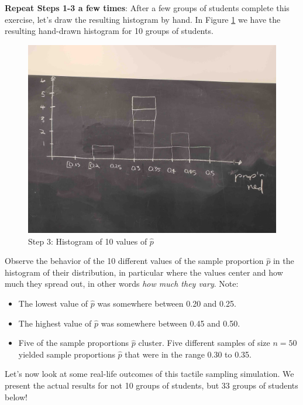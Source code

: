 \documentclass[12pt,]{krantz}
\providecommand{\tightlist}{%
  \setlength{\itemsep}{0pt}\setlength{\parskip}{0pt}}
\theoremstyle{definition}
\theoremstyle{definition}
\theoremstyle{definition}
\theoremstyle{remark}
\begin{document}
\textbf{Repeat Steps 1-3 a few times}: After a few groups of students
complete this exercise, let's draw the resulting histogram by hand. In
Figure \ref{fig:tactile4} we have the resulting hand-drawn histogram for
10 groups of students.

\begin{figure}

{\centering \includegraphics[width=0.8\linewidth]{images/sampling/tactile_3_c} 

}

\caption{Step 3: Histogram of 10 values of $\widehat{p}$}\label{fig:tactile4}
\end{figure}

Observe the behavior of the 10 different values of the sample proportion
\(\widehat{p}\) in the histogram of their distribution, in particular
where the values center and how much they spread out, in other words
\emph{how much they vary}. Note:

\begin{itemize}
\tightlist
\item
  The lowest value of \(\widehat{p}\) was somewhere between 0.20 and
  0.25.
\item
  The highest value of \(\widehat{p}\) was somewhere between 0.45 and
  0.50.
\item
  Five of the sample proportions \(\widehat{p}\) cluster. Five different
  samples of size \(n=50\) yielded sample proportions \(\widehat{p}\)
  that were in the range 0.30 to 0.35.
\end{itemize}

Let's now look at some real-life outcomes of this tactile sampling
simulation. We present the actual results for not 10 groups of students,
but 33 groups of students below!
\end{document}
